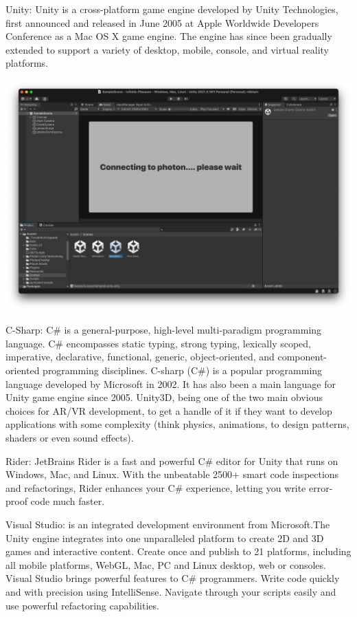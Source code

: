 \documentclass[12pt]{report}
\begin{document}
\centering
\justifying
\setlength{\parindent}{0em}
\renewcommand{\baselinestretch}{1.5}
Unity: Unity is a cross-platform game engine developed by Unity Technologies, 
first announced and released in June 2005 at Apple Worldwide Developers Conference as a Mac OS X game engine.
The engine has since been gradually extended to support a variety of desktop, mobile, console, and virtual reality platforms.

\setlength{\parindent}{0em}
\includegraphics[scale=0.2]{Haar.png}

C-Sharp: C\# is a general-purpose, high-level multi-paradigm programming language. C\# encompasses static typing, strong typing, lexically scoped, imperative, declarative, functional, generic, object-oriented, and component-oriented programming disciplines. C-sharp (C\#) is a popular programming language developed by Microsoft in 2002. It has also been a main language for Unity game engine since 2005. Unity3D, being one of the two main obvious choices for AR/VR development, to get a handle of it if they want to develop applications with some complexity (think physics, animations, to design patterns, shaders or even sound effects).

Rider: JetBrains Rider is a fast and powerful C\# editor for Unity that runs on Windows, Mac, and Linux. With the unbeatable 2500+ smart code inspections and refactorings, Rider enhances your C\# experience, letting you write error-proof code much faster.

Visual Studio: is an integrated development environment from Microsoft.The Unity engine integrates into one unparalleled platform to create 2D and 3D games and interactive content. Create once and publish to 21 platforms, including all mobile platforms, WebGL, Mac, PC and Linux desktop, web or consoles. Visual Studio brings powerful features to C\# programmers. Write code quickly and with precision using IntelliSense. Navigate through your scripts easily and use powerful refactoring capabilities.
\end{document}
